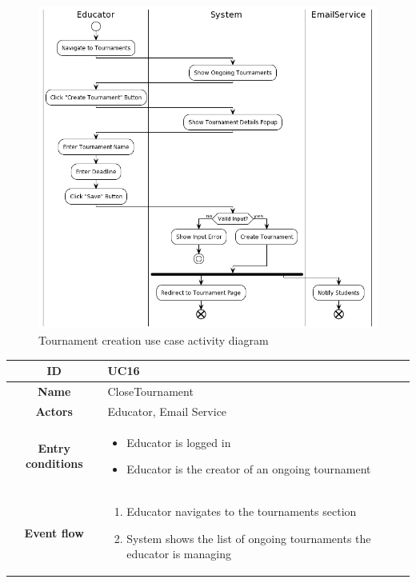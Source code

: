 \begin{center}
\begin{tabular}{ |c|m{10cm}| }
        \hline
    \end{tabular}
    \begin{figure}[H]
        \includegraphics[scale=0.9]{Diagrams/activity_createtournament.png}
        \caption{Tournament creation use case activity diagram}
    \end{figure}
    \begin{tabular}{ |c|m{10cm}| }
        \hline
        \textbf{ID} & UC16 \\
        \hline
        \textbf{Name} & CloseTournament \\
        \hline
        \textbf{Actors} & Educator, Email Service \\
        \hline
        \textbf{Entry conditions} &
        \begin{itemize}
            \item Educator is logged in
            \item Educator is the creator of an ongoing tournament
        \end{itemize} \\
        \hline
        \textbf{Event flow} &
        \begin{enumerate}
            \item Educator navigates to the tournaments section
            \item System shows the list of ongoing tournaments the educator is managing

\end{enumerate}
\end{tabular}
\end{center}
